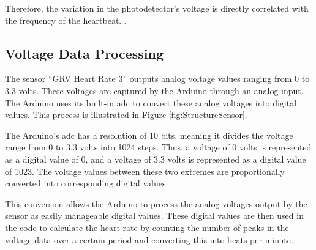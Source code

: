 {Therefore, the variation in the photodetector’s voltage is directly correlated with the frequency of the heartbeat. \cite{Traenkler:2014}.


\subsection{Voltage Data Processing}

The sensor ``GRV Heart Rate 3'' outputs analog voltage values ranging from 0 to 3.3 volts. These voltages are captured by the Arduino through an analog input. The Arduino uses its built-in \ac{adc} to convert these analog voltages into digital values. This process is illustrated in Figure \ref{fig:StructureSensor}.

The Arduino’s \ac{adc} has a resolution of 10 bits, meaning it divides the voltage range from 0 to 3.3 volts into 1024 steps. Thus, a voltage of 0 volts is represented as a digital value of 0, and a voltage of 3.3 volts is represented as a digital value of 1023. The voltage values between these two extremes are proportionally converted into corresponding digital values. \cite{Parthier:2016} 

This conversion allows the Arduino to process the analog voltages output by the sensor as easily manageable digital values. These digital values are then used in the code to calculate the heart rate by counting the number of peaks in the voltage data over a certain period and converting this into beats per minute.

\bigskip

\begin{center}
    \hspace*{-2.5cm} %
    \begin{adjustbox}{valign=t}
\end{adjustbox}
\end{center}}
